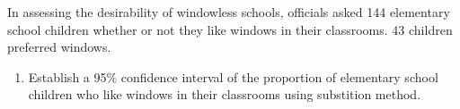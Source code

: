   \item %
    In assessing the desirability of windowless schools, officials asked 144
    elementary school children whether or not they like windows in their
    classrooms. 43 children preferred
    windows.
    \begin{enumerate}
      \item Establish a 95\% confidence interval of the proportion of elementary school
        children who like windows in their classrooms using substition method.
    \end{enumerate}

